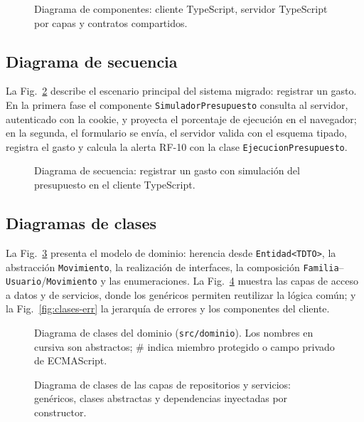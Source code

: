 \documentclass[conference,a4paper]{IEEEtran}
\begin{document}
\begin{figure}[!t]
\centering
\resizebox{\textwidth}{!}{}
\caption{Diagrama de componentes: cliente TypeScript, servidor TypeScript por capas y contratos compartidos.}
\label{fig:componentes}
\end{figure}

\subsection{Diagrama de secuencia}
La Fig.~\ref{fig:secuencia} describe el escenario principal del sistema migrado: registrar un gasto. En la primera fase el componente \texttt{SimuladorPresupuesto} consulta al servidor, autenticado con la cookie, y proyecta el porcentaje de ejecución en el navegador; en la segunda, el formulario se envía, el servidor valida con el esquema tipado, registra el gasto y calcula la alerta RF-10 con la clase \texttt{EjecucionPresupuesto}.

\begin{figure}[!t]
\centering
\resizebox{\textwidth}{!}{}
\caption{Diagrama de secuencia: registrar un gasto con simulación del presupuesto en el cliente TypeScript.}
\label{fig:secuencia}
\end{figure}

\subsection{Diagramas de clases}
La Fig.~\ref{fig:clases-dominio} presenta el modelo de dominio: herencia desde \texttt{Entidad<TDTO>}, la abstracción \texttt{Movimiento}, la realización de interfaces, la composición \texttt{Familia}--\texttt{Usuario}/\texttt{Movimiento} y las enumeraciones. La Fig.~\ref{fig:clases-capas} muestra las capas de acceso a datos y de servicios, donde los genéricos permiten reutilizar la lógica común; y la Fig.~\ref{fig:clases-err} la jerarquía de errores y los componentes del cliente.

\begin{figure}[p]
\centering
\resizebox{\textwidth}{!}{}
\caption{Diagrama de clases del dominio (\texttt{src/dominio}). Los nombres en cursiva son abstractos; \# indica miembro protegido o campo privado de ECMAScript.}
\label{fig:clases-dominio}
\end{figure}

\begin{figure}[p]
\centering
\resizebox{\textwidth}{!}{}
\caption{Diagrama de clases de las capas de repositorios y servicios: genéricos, clases abstractas y dependencias inyectadas por constructor.}
\label{fig:clases-capas}
\end{figure}
\end{document}
